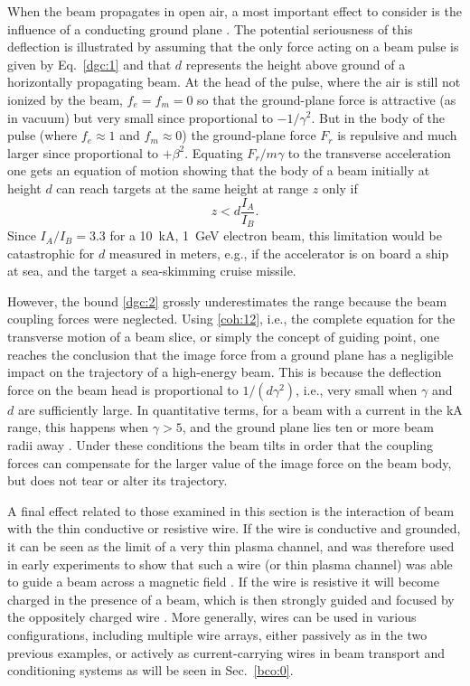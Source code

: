 \documentclass [12pt,a4paper,     ]{report} %
\begin{document}
   When the beam propagates in open air, a most important effect to consider is the influence of a conducting ground plane \cite{FERNS1991B}.  The potential seriousness of this deflection is illustrated by assuming that the only force acting on a beam pulse is given by Eq.~\eqref{dgc:1} and that $d$ represents the height above ground of a horizontally propagating beam.  At the head of the pulse, where the air is still not ionized by the beam, $f_e=f_m=0$ so that the ground-plane force is attractive (as in vacuum) but very small since proportional to $-1/\gamma^2$.  But in the body of the pulse (where $f_e\approx 1$ and $f_m\approx 0$) the ground-plane force $F_r$ is repulsive and much larger since proportional to $+\beta^2$.  Equating $F_r/ m \gamma$ to the transverse acceleration one gets an equation of motion showing that the body of a beam initially at height $d$ can reach targets at the same height at range $z$ only if \cite{FERNS1991B}
%
\begin{equation}\label{dgc:2} %
          z < d \frac{I_A}{I_B}.
\end{equation}
%
Since ${I_A}/{I_B}= 3.3$ for a 10~kA, 1~GeV electron beam, this limitation would be catastrophic for $d$ measured in meters, e.g., if the accelerator is on board a ship at sea, and the target a sea-skimming cruise missile.  

However, the bound \eqref{dgc:2} grossly underestimates the range because the beam coupling forces were neglected.  Using \eqref{coh:12}, i.e., the complete equation for the transverse motion of a beam slice, or simply the concept of guiding point, one reaches the conclusion that the image force from a ground plane has a negligible impact on the trajectory of a high-energy beam.  This is because the deflection force on the beam head is proportional to $1/(d\gamma^2)$, i.e., very small when $\gamma$ and $d$ are sufficiently large.  In quantitative terms, for a beam with a current in the kA range, this happens when  $\gamma > 5$, and the ground plane lies ten or more beam radii away \cite{FERNS1991B}.  Under these conditions the beam tilts in order that the coupling forces can compensate for the larger value of the image force on the beam body, but does not tear or alter its trajectory.

   A final effect related to those examined in this section is the interaction of beam with the thin conductive or resistive wire.  If the wire is conductive and grounded, it can be seen as the limit of a very thin plasma channel, and was therefore used in early experiments to show that such a wire (or thin plasma channel) was able to guide a beam across a magnetic field \cite{DIDEN1977-}. If the wire is resistive it will become charged in the presence of a beam, which is then strongly guided and focused by the oppositely charged wire \cite{PRONO1983-}.  More generally, wires can be used in various configurations, including multiple wire arrays, either passively as in the two previous examples, or actively as current-carrying wires in beam transport and conditioning systems as will be seen in Sec.~\ref{bco:0}.
\end{document}
